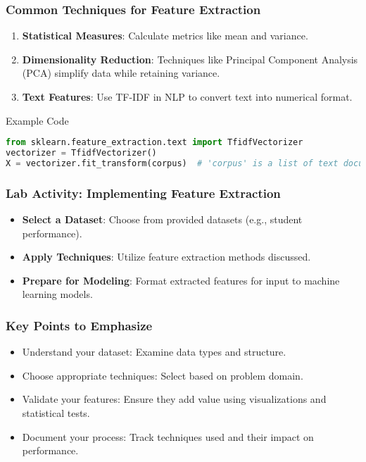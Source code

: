 \documentclass[aspectratio=169]{beamer}
\begin{document}
\begin{frame}[fragile]
    \frametitle{Common Techniques for Feature Extraction}
    \begin{enumerate}
        \item \textbf{Statistical Measures}: Calculate metrics like mean and variance.
        \item \textbf{Dimensionality Reduction}: Techniques like Principal Component Analysis (PCA) simplify data while retaining variance.
        \item \textbf{Text Features}: Use TF-IDF in NLP to convert text into numerical format.
    \end{enumerate}
    \begin{block}{Example Code}
    \begin{lstlisting}[language=Python]
from sklearn.feature_extraction.text import TfidfVectorizer
vectorizer = TfidfVectorizer()
X = vectorizer.fit_transform(corpus)  # 'corpus' is a list of text documents
    \end{lstlisting}
    \end{block}
\end{frame}

\begin{frame}[fragile]
    \frametitle{Lab Activity: Implementing Feature Extraction}
    \begin{itemize}
        \item \textbf{Select a Dataset}: Choose from provided datasets (e.g., student performance).
        \item \textbf{Apply Techniques}: Utilize feature extraction methods discussed.
        \item \textbf{Prepare for Modeling}: Format extracted features for input to machine learning models.
    \end{itemize}
\end{frame}

\begin{frame}[fragile]
    \frametitle{Key Points to Emphasize}
    \begin{itemize}
        \item Understand your dataset: Examine data types and structure.
        \item Choose appropriate techniques: Select based on problem domain.
        \item Validate your features: Ensure they add value using visualizations and statistical tests.
        \item Document your process: Track techniques used and their impact on performance.
    \end{itemize}
\end{frame}
\end{document}
